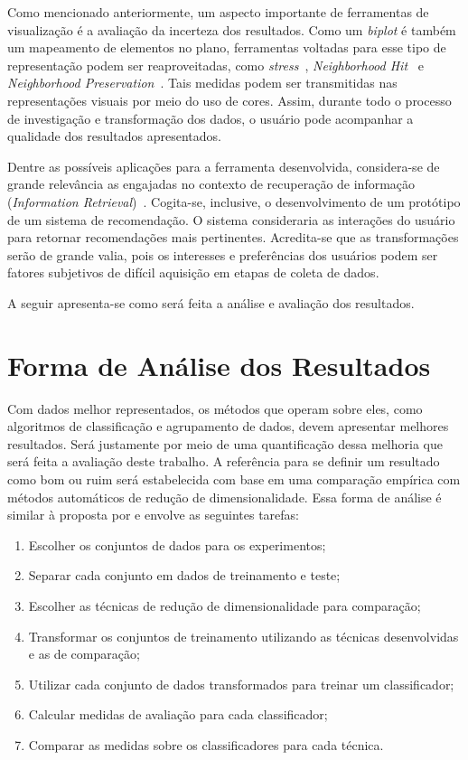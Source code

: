 Como mencionado anteriormente, um aspecto importante de
ferramentas de visualização é a avaliação da incerteza dos
resultados. Como um \emph{biplot} é também um mapeamento de
elementos no plano, ferramentas voltadas para esse tipo de
representação podem ser reaproveitadas, como
\emph{stress}~\cite{Kruskal1964}, \emph{Neighborhood
Hit}~\cite{Paulovich2008} e \emph{Neighborhood
Preservation}~\cite{Paulovich2008a}. Tais medidas
podem ser transmitidas nas representações visuais por meio
do uso de cores. Assim, durante todo o processo de
investigação e transformação dos dados, o usuário 
pode acompanhar a qualidade dos resultados apresentados. 

Dentre as possíveis aplicações para a ferramenta
desenvolvida, considera-se de grande relevância as
engajadas no contexto de recuperação de informação
(\emph{Information Retrieval})~\cite{Manning2008}.
Cogita-se, inclusive, o desenvolvimento de um protótipo de um
sistema de recomendação. O sistema consideraria
as interações do usuário para retornar recomendações mais
pertinentes. Acredita-se que as transformações serão de
grande valia, pois os interesses e preferências dos usuários
podem ser fatores subjetivos de difícil aquisição em etapas
de coleta de dados.

A seguir apresenta-se como será feita a análise e avaliação
dos resultados.

\section{Forma de Análise dos Resultados}

Com dados melhor representados, os métodos que operam sobre
eles, como algoritmos de classificação e agrupamento de
dados, devem apresentar melhores resultados. Será justamente
por meio de uma quantificação dessa melhoria que será feita
a avaliação deste trabalho. A referência para se definir um
resultado como bom ou ruim será estabelecida com base em uma
comparação empírica com métodos automáticos de redução de
dimensionalidade. Essa forma de análise é similar à
proposta por \citet{Maaten2009} e envolve as seguintes
tarefas:

\begin{enumerate}
    \item Escolher os conjuntos de dados para os
        experimentos;
    \item Separar cada conjunto em dados de treinamento
        e teste;
    \item Escolher as técnicas de redução de
        dimensionalidade para comparação;
    \item Transformar os conjuntos de treinamento utilizando
        as técnicas desenvolvidas e as de comparação;
    \item Utilizar cada conjunto de dados transformados para
        treinar um classificador;
    \item Calcular medidas de avaliação para cada
        classificador;
    \item Comparar as medidas sobre os classificadores para
        cada técnica.
\end{enumerate}

